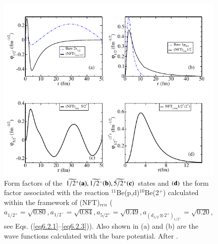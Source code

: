       \begin{figure}
      \centerline{\includegraphics*[width=16cm,angle=0]{C8/figsC8/fig6_2_4}}
      	\caption{ Form factors  of the $\widetilde {1/2^+} {\bf (a)}, \widetilde{1/2^-} {\bf (b)}, \widetilde{5/2^+} {\bf (c)}$ 
      	states  and ${\bf (d)}$ the form factor associated with the reaction
      	$^{11}$Be(p,d)$^{10}$Be(2$^+$)
      	calculated within the framework of (NFT)$_{ren }$ 
      	($a_{1/2^+} = \sqrt{0.80},
      	a_{1/2^-} = \sqrt{0.84}, a_{5/2^+} = \sqrt{0.49}, a_{(d_{5/2}\otimes 2^+)_{1/2^+}} = \sqrt{0.20}$, see Eqs. (\ref{eq6.2.1}--\ref{eq6.2.3})).
      	Also shown in (a) and (b) are 
      	the wave functions calculated with the bare potential. After \cite{Barranco:17}.
      	}\label{fig6.2.4}
      \end{figure} 
